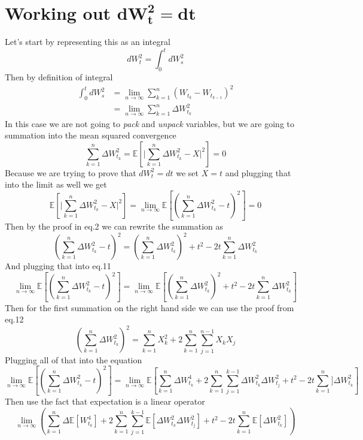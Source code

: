 \documentclass{article}
\begin{document}
\section*{Working out $\boldsymbol{dW_t^2 = dt}$}
Let's start by representing this as an integral
$$
dW_t^2 = \int_0^t dW_s^2
$$
Then by definition of integral 
\begin{equation}
\begin{split}
    \int_0^t dW_s^2 &= \lim_{n \to \infty} \sum_{k=1}^n \left( W_{t_k} - W_{t_{k-1}} \right)^2 \\ 
    & = \lim_{n \to \infty} \sum_{k=1}^n \Delta W_{t_k}^2
\end{split}
\end{equation}
In this case we are not going to \emph{pack} and \emph{unpack} variables, but we are going to summation into the mean squared convergence
$$
\sum_{k=1}^n \Delta W_{t_k}^2 = \mathbb{E} \left[ \biggr\rvert \sum_{k=1}^n \Delta W_{t_k}^2 - X \biggr\rvert^2 \right] = 0
$$
Because we are trying to prove that $dW_t^2 = dt$ we set $X = t$ and plugging that into the limit as well we get
\begin{equation}
\mathbb{E} \left[ \biggr\rvert \sum_{k=1}^n \Delta W_{t_k}^2 - X \biggr\rvert^2 \right] = \lim_{n \to \infty} \mathbb{E} \left[  \left(\sum_{k=1}^n \Delta W_{t_k}^2 - t\right)^2 \right] = 0
\end{equation}
Then by the proof in eq.2 we can rewrite the summation as 
$$
\left(\sum_{k=1}^n \Delta W_{t_k}^2 - t\right)^2 = \left( \sum_{k=1}^n \Delta W_{t_k}^2 \right)^2 + t^2 - 2t \sum_{k=1}^n \Delta W_{t_k}^2
$$
And plugging that into eq.11
\begin{equation}
\lim_{n \to \infty} \mathbb{E} \left[  \left(\sum_{k=1}^n \Delta W_{t_k}^2 - t\right)^2 \right] = \lim_{n \to \infty} \mathbb{E} \left[ \left( \sum_{k=1}^n \Delta W_{t_k}^2 \right)^2 + t^2 - 2t \sum_{k=1}^n \Delta W_{t_k}^2 \right]
\end{equation}
Then for the first summation on the right hand side we can use the proof from eq.12
$$
\left( \sum_{k=1}^n \Delta W_{t_k}^2 \right)^2 = \sum_{k=1}^n  X_k^2 + 2 \sum_{k=1}^n \sum_{j=1}^{n-1} X_k X_j
$$
Plugging all of that into the equation 
$$
\lim_{n \to \infty} \mathbb{E} \left[  \left(\sum_{k=1}^n \Delta W_{t_k}^2 - t\right)^2 \right] = \lim_{n \to \infty} \mathbb{E} \left[ \sum_{k=1}^n \Delta W_{t_k}^4 + 2 \sum_{k=1}^n \sum_{j=1}^{k-1} \Delta W_{t_k}^2 \Delta W_{t_j}^2 + t^2 - 2t \sum_{k=1}^n ] \Delta W_{t_k}^2 \right]
$$
Then use the fact that expectation is a linear operator
$$
\lim_{n \to \infty} \left( \sum_{k=1}^n \Delta \mathbb{E} \left[W_{t_k}^4 \right]+ 2 \sum_{k=1}^n \sum_{j=1}^{k-1} \mathbb{E} \left[ \Delta W_{t_k}^2 \Delta W_{t_j}^2 \right] + t^2 - 2t \sum_{k=1}^n \mathbb{E} \left[\Delta W_{t_k}^2 \right] \right)
$$
\end{document}
